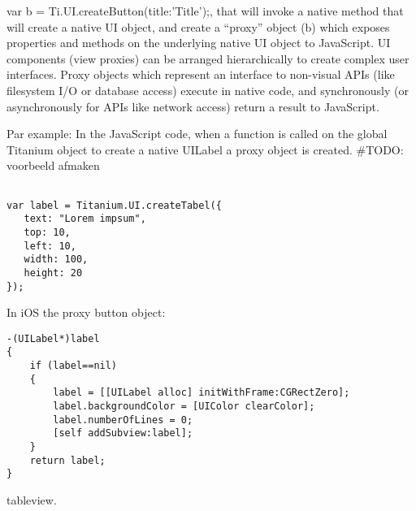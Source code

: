 var b = Ti.UI.createButton({title:'Title'});, that will invoke a native method that will create a native UI object, and create a “proxy” object (b) which exposes properties and methods on the underlying native UI object to JavaScript.
UI components (view proxies) can be arranged hierarchically to create complex user interfaces. Proxy objects which represent an interface to non-visual APIs (like filesystem I/O or database access) execute in native code, and synchronously (or asynchronously for APIs like network access) return a result to JavaScript. 


Par example: In the JavaScript code, when a function is called on the global Titanium object to create a native UILabel a proxy object is created.
\#TODO: voorbeeld afmaken
\begin{verbatim}

var label = Titanium.UI.createTabel({
   text: "Lorem impsum",
   top: 10,
   left: 10,
   width: 100,
   height: 20
});
\end{verbatim}


In iOS the proxy button object:

\begin{verbatim}
-(UILabel*)label
{
    if (label==nil)
    {
        label = [[UILabel alloc] initWithFrame:CGRectZero];
        label.backgroundColor = [UIColor clearColor];
        label.numberOfLines = 0;
        [self addSubview:label];
    }
    return label;
}
\end{verbatim}




tableview.

